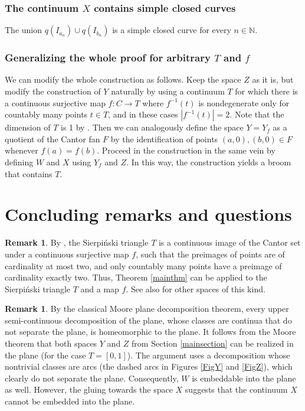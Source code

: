 \documentclass[12pt]{article}
\theoremstyle{definition}
\newtheorem{remark}[theorem]{Remark}
\theoremstyle{remark}
\begin{document}
\subsubsection*{The continuum $X$ contains simple closed curves}

The union $q(I_{a_n})\cup q(I_{b_n})$ is a simple closed curve for every $n\in\mathbb N$.


\subsubsection*{Generalizing the whole proof for arbitrary $T$ and $f$}

We can modify the whole construction as follows.
Keep the space $Z$ as it is, but modify the construction of $Y$ naturally by using a continuum $T$ for which there is a continuous surjective map $f:C\to T$ where $f^{-1}(t)$ is nondegenerate only for countably many points $t\in T$, and in these cases $|f^{-1}(t)|=2$.
Note that the dimension of $T$ is 1 by \cite[Problem 1.7.F c)]{EngelkingDim}.
Then we can analogously define the space $Y=Y_f$ as a quotient of the Cantor fan $F$ by the identification of points $(a,0), (b,0)\in F$ whenever $f(a)=f(b)$. Proceed in the construction in the same vein by defining $W$ and $X$ using $Y_f$ and $Z$.
In this way, the construction yields a broom that contains $T$.




\section{Concluding remarks and questions}

\begin{remark}\label{remarkmore}
By \cite{WinklerTriangle}, the Sierpiński triangle $T$ is a continuous image of the Cantor set under a continuous surjective map $f$, such that the preimages of points are of cardinality at most two, and only countably many points have a preimage of cardinality exactly two.
Thus, Theorem \ref{mainthm} can be applied to the Sierpiński triangle $T$ and a map $f$. See also \cite{VejnarTriangle} for other spaces of this kind. 
\end{remark}

\begin{remark}
By the classical Moore plane decomposition theorem, every upper semi-continuous decomposition of the plane, whose classes are continua that do not separate the plane, is homeomorphic to the plane.
It follows from the Moore theorem that both spaces $Y$ and $Z$ from Section \ref{mainsection} can be realized in the plane (for the case $T=[0,1]$). The argument uses a decomposition whose nontrivial classes are arcs (the dashed arcs in Figures \ref{FigY} and \ref{FigZ}), which clearly do not separate the plane.
Consequently, $W$ is embeddable into the plane as well.
However, the gluing towards the space $X$ suggests that the continuum $X$ cannot be embedded into the plane.
\end{remark}
\end{document}
